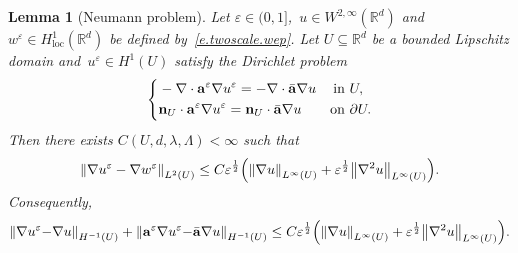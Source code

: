 \documentclass[11pt]{article} %
\numberwithin{equation}{section}
\newtheorem{lemma}[theorem]{Lemma}
\theoremstyle{definition}
\let\originalleft\left
\let\originalright\right
\renewcommand{\left}{\mathopen{}\mathclose\bgroup\originalleft}
\renewcommand{\right}{\aftergroup\egroup\originalright}
\newcommand*{\Rd}{\ensuremath{\mathbb{R}^d}}
\newcommand{\eps}{\varepsilon}
\newcommand{\ep}{\eps}
\renewcommand{\a}{\mathbf{a}}
\newcommand{\ahom}{\bar{\a}}
\begin{document}
\begin{lemma}[Neumann problem]
\label{l.NP.2infty}
Let $\ep\in (0,1]$,~$u\in W^{2,\infty}(\Rd)$ and~$w^\ep\in H^1_{\mathrm{loc}}(\Rd)$ be defined by~\eqref{e.twoscale.wep}. Let $U\subseteq\Rd$ be a bounded Lipschitz domain and~$u^\ep \in H^1(U)$ satisfy the Dirichlet problem 
\begin{align}
\label{e.eq.NP.2infty}
\left\{
\begin{aligned}
& -\nabla \cdot \a^\ep \nabla u^\ep = - \nabla \cdot \ahom\nabla u & \mbox{in} & \ U, 
\\
& \mathbf{n}_{U} \cdot \a^\ep \nabla u^\ep = \mathbf{n}_{U} \cdot \ahom\nabla u & \mbox{on} & \ \partial U. 
\end{aligned}
\right.
\end{align}
Then there exists $C(U,d,\lambda,\Lambda)<\infty$ such that 
\begin{equation}
\label{e.ee.easy.NP}
\left\| \nabla u^\ep - \nabla w^\ep \right\|_{{L}^2(U)} 
\leq
C \ep^{\frac12} \left(  \left\| \nabla u \right\|_{L^\infty(U)}
+
\ep^{\frac12} \left\| \nabla^2 u \right\|_{L^\infty(U)}
\right).
\end{equation}
Consequently, 
\begin{equation}
\label{e.ee.easy2.NP}
\left\| 
\nabla u^\ep {-} \nabla u \right\|_{H^{-1}(U)} 
+
\left\| 
\a^\ep \nabla u^\ep{ -} \ahom \nabla u \right\|_{H^{-1}(U)}
\leq 
C \ep^{\frac12} \left(  \left\| \nabla u \right\|_{L^\infty(U)}
+
\ep^{\frac12} \left\| \nabla^2 u \right\|_{L^\infty(U)}
\right).
\end{equation}
\end{lemma}
\end{document}
